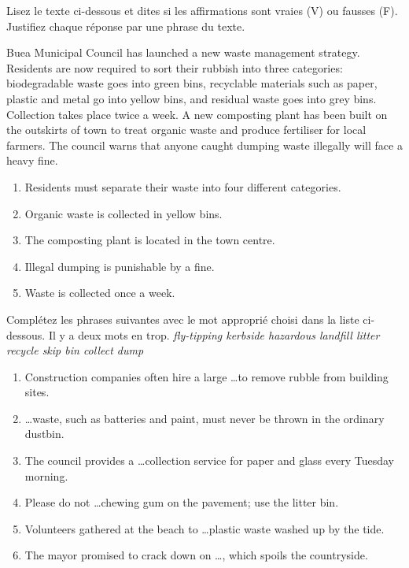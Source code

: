 \documentclass[11pt]{article}
\begin{document}
\begin{exercice}
Lisez le texte ci-dessous et dites si les affirmations sont vraies (V) ou fausses (F). Justifiez chaque réponse par une phrase du texte.

\begin{textebox}
Buea Municipal Council has launched a new waste management strategy. Residents are now required to sort their rubbish into three categories: biodegradable waste goes into green bins, recyclable materials such as paper, plastic and metal go into yellow bins, and residual waste goes into grey bins. Collection takes place twice a week. A new composting plant has been built on the outskirts of town to treat organic waste and produce fertiliser for local farmers. The council warns that anyone caught dumping waste illegally will face a heavy fine.
\end{textebox}

\begin{enumerate}
\item Residents must separate their waste into four different categories.
\item Organic waste is collected in yellow bins.
\item The composting plant is located in the town centre.
\item Illegal dumping is punishable by a fine.
\item Waste is collected once a week.
\end{enumerate}
\end{exercice}

\begin{exercice}
Complétez les phrases suivantes avec le mot approprié choisi dans la liste ci-dessous. Il y a deux mots en trop.
\medskip
\noindent \textit{fly-tipping \quad kerbside \quad hazardous \quad landfill \quad litter \quad recycle \quad skip \quad bin \quad collect \quad dump}
\begin{enumerate}
\item Construction companies often hire a large \dots to remove rubble from building sites.
\item \dots waste, such as batteries and paint, must never be thrown in the ordinary dustbin.
\item The council provides a \dots collection service for paper and glass every Tuesday morning.
\item Please do not \dots chewing gum on the pavement; use the litter bin.
\item Volunteers gathered at the beach to \dots plastic waste washed up by the tide.
\item The mayor promised to crack down on \dots, which spoils the countryside.
\end{enumerate}
\end{exercice}
\end{document}

